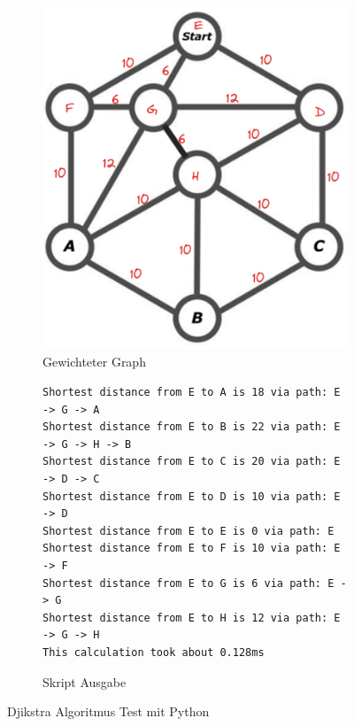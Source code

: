 \begin{figure}[H]
\begin{subfigure}{0.275\textwidth}
\includegraphics[width=0.95\linewidth]{img/graph_with_weighted_edges.png} 
\caption{Gewichteter Graph}
\label{fig:weighted-graph}
\end{subfigure}
\begin{subfigure}{0.720\textwidth}
\begin{footnotesize}
\begin{verbatim}
Shortest distance from E to A is 18 via path: E -> G -> A
Shortest distance from E to B is 22 via path: E -> G -> H -> B
Shortest distance from E to C is 20 via path: E -> D -> C
Shortest distance from E to D is 10 via path: E -> D
Shortest distance from E to E is 0 via path: E
Shortest distance from E to F is 10 via path: E -> F
Shortest distance from E to G is 6 via path: E -> G
Shortest distance from E to H is 12 via path: E -> G -> H
This calculation took about 0.128ms
\end{verbatim}
\end{footnotesize}
\caption{Skript Ausgabe}
\label{fig:djikstra-test-skript-output}
\end{subfigure}

\caption{Djikstra Algoritmus Test mit Python}
\label{fig:djikstra-test-output}
\end{figure}

